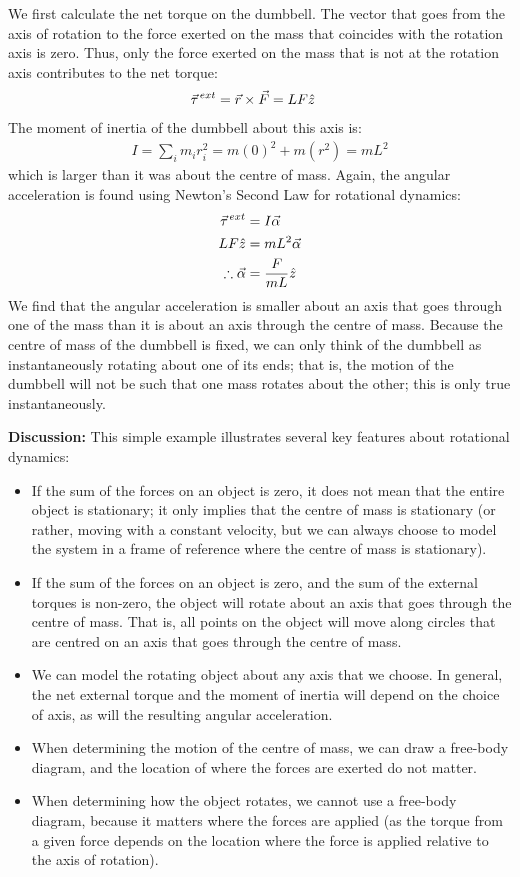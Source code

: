 \begin{example}
\begin{enumerate}[label=\alph*),topsep=-10pt]
We first calculate the net torque on the dumbbell. The vector that goes from the axis of rotation to the force exerted on the mass that coincides with the rotation axis is zero. Thus, only the force exerted on the mass that is not at the rotation axis contributes to the net torque:
\begin{align*}
\pvec\tau^{ext}&= \vec r \times \vec F = LF\hat z
\end{align*}
The moment of inertia of the dumbbell about this axis is:
\begin{align*}
I = \sum_i  m_ir_i^2 = m(0)^2 + m(r^2) = mL^2
\end{align*}
which is larger than it was about the centre of mass. Again, the angular acceleration is found using Newton's Second Law for rotational dynamics:
\begin{align*}
\pvec\tau^{ext}&= I\vec\alpha\\
LF\hat z&=mL^2\vec\alpha\\
\therefore \vec\alpha &= \frac{F}{mL}\hat z
\end{align*}
We find that the angular acceleration is smaller about an axis that goes through one of the mass than it is about an axis through the centre of mass. Because the centre of mass of the dumbbell is fixed, we can only think of the dumbbell as instantaneously rotating about one of its ends; that is, the motion of the dumbbell will not be such that one mass rotates about the other; this is only true instantaneously.
\end{enumerate}
\textbf{Discussion: }This simple example illustrates several key features about rotational dynamics:
\begin{itemize}
\item If the sum of the forces on an object is zero, it does not mean that the entire object is stationary; it only implies that the centre of mass is stationary (or rather, moving with a constant velocity, but we can always choose to model the system in a frame of reference where the centre of mass is stationary).
\item If the sum of the forces on an object is zero, and the sum of the external torques is non-zero, the object will rotate about an axis that goes through the centre of mass. That is, all points on the object will move along circles that are centred on an axis that goes through the centre of mass. 
\item We can model the rotating object about any axis that we choose. In general, the net external torque and the moment of inertia will depend on the choice of axis, as will the resulting angular acceleration. 
\item When determining the motion of the centre of mass, we can draw a free-body diagram, and the location of where the forces are exerted do not matter.
\item When determining how the object rotates, we cannot use a free-body diagram, because it matters where the forces are applied (as the torque from a given force depends on the location where the force is applied relative to the axis of rotation).
\end{itemize}
\end{example}

